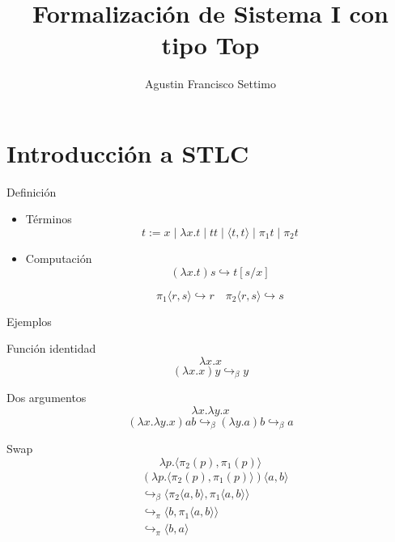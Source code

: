 \documentclass[aspectratio=149]{beamer}
\title{Formalización de Sistema I con tipo Top}
\author{Agustin Francisco Settimo}
\date{}
\begin{document}
	
\begin{frame}[plain]
    \maketitle
\end{frame}

\section{Introducción a STLC}

\begin{frame}{Definición}
	\begin{itemize}[<+->]
		\item Términos
			\[ t := x \mid \lambda x.t \mid t t \mid \langle t, t \rangle \mid \pi_1 t \mid \pi_2 t \]
		
		\item Computación
			\[ (\lambda x.t) s \hookrightarrow t[s/x] \]

			\[ \pi_1 \langle r, s \rangle \hookrightarrow r \quad \pi_2 \langle r, s \rangle \hookrightarrow s \]
	\end{itemize}
	
\end{frame}

\begin{frame}{Ejemplos}
	\begin{exampleblock}{Función identidad}
		\[ \lambda x.x \]
		\[ (\lambda x.x) y \hookrightarrow_\beta y \]
	\end{exampleblock}
	
	\begin{exampleblock}{Dos argumentos}
		\[ \lambda x. \lambda y.x \]
		\[ (\lambda x. \lambda y.x) a b \hookrightarrow_\beta (\lambda y.a) b \hookrightarrow_\beta a \]
	\end{exampleblock}

	\begin{exampleblock}{Swap}
		\[ \lambda p. \langle \pi_2 (p), \pi_1 (p) \rangle \]
		\begin{align*}
			&(\lambda p. \langle \pi_2 (p), \pi_1 (p) \rangle) \langle a,b \rangle \\
			&\hookrightarrow_\beta \langle \pi_2 \langle a,b \rangle, \pi_1 \langle a,b \rangle \rangle \\
			&\hookrightarrow_\pi \langle b, \pi_1 \langle a,b \rangle \rangle \\
			&\hookrightarrow_\pi \langle b, a \rangle
		\end{align*}
	\end{exampleblock}
\end{frame}
\end{document}
